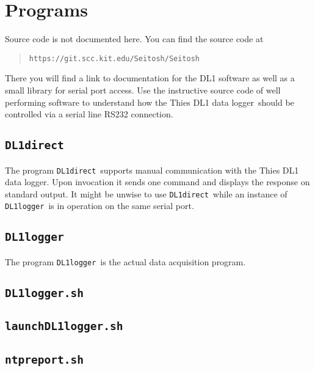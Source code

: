 \documentclass[twoside]{article}
\newcommand{\DTDL}{Thies DL1 data logger}
\newcommand{\Dlaunchscript}{\texttt{launchDL1logger.sh}}
\newcommand{\Dlogscript}{\texttt{DL1logger.sh}}
\newcommand{\Dntpscript}{\texttt{ntpreport.sh}}
\newcommand{\DLdirect}{\texttt{DL1direct}}
\newcommand{\DLlogger}{\texttt{DL1logger}}
\begin{document}
\section{Programs}
Source code is not documented here. 
You can find the source code at
\begin{quote}
\verb+https://git.scc.kit.edu/Seitosh/Seitosh+
\end{quote}
There you will find a link to
documentation for the DL1 software as well as a small
library for serial port access.
Use the instructive source code of well performing software to understand how
the \DTDL\ should be controlled via a serial line RS232 connection.

\subsection{\DLdirect}
\label{sec:prog:dldirect}
The program \DLdirect\ supports manual communication with the \DTDL.
Upon invocation it sends one command and displays the response on standard
output.
It might be unwise to use \DLdirect\ while an instance of \DLlogger\ is in
operation on the same serial port.

\subsection{\DLlogger}
\label{sec:prog:dllogger}
The program \DLlogger\ is the actual data acquisition program.

\subsection{\Dlogscript}
\label{sec:prog:dlogscript}

\subsection{\Dlaunchscript}
\label{sec:prog:dlaunchscript}

\subsection{\Dntpscript}
\label{sec:prog:dlntpscript}

\end{document}
